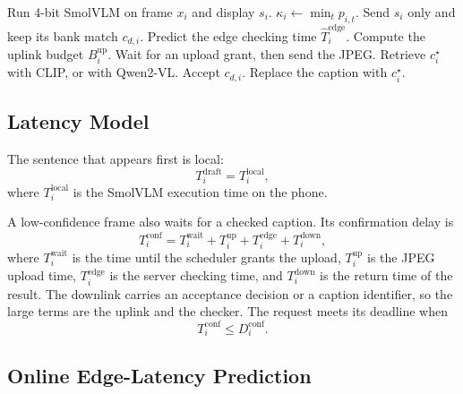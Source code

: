 \begin{algorithm}[t]
\caption{Local sentence and edge check}
\label{alg:verify}
\begin{algorithmic}[1]
\STATE Run 4-bit SmolVLM on frame $x_i$ and display $s_i$.
\STATE $\kappa_i\leftarrow\min_t p_{i,t}$.
    \STATE Send $s_i$ only and keep its bank match $c_{d,i}$.
\ELSE
    \STATE Predict the edge checking time $\hat T_i^{\mathrm{edge}}$.
    \STATE Compute the uplink budget $B_i^{\mathrm{up}}$.
    \STATE Wait for an upload grant, then send the JPEG.
    \STATE Retrieve $c_i^\star$ with CLIP, or with Qwen2-VL.
        \STATE Accept $c_{d,i}$.
    \ELSE
        \STATE Replace the caption with $c_i^\star$.
    \ENDIF
\ENDIF
\end{algorithmic}
\end{algorithm}

\subsection{Latency Model}

The sentence that appears first is local:
\begin{equation}
T_i^{\mathrm{draft}}
=
T_i^{\mathrm{local}},
\end{equation}
where $T_i^{\mathrm{local}}$ is the SmolVLM execution time on the phone.

A low-confidence frame also waits for a checked caption. Its confirmation
delay is
\begin{equation}
T_i^{\mathrm{conf}}
=
T_i^{\mathrm{wait}}
+
T_i^{\mathrm{up}}
+
T_i^{\mathrm{edge}}
+
T_i^{\mathrm{down}},
\end{equation}
where $T_i^{\mathrm{wait}}$ is the time until the scheduler grants the
upload, $T_i^{\mathrm{up}}$ is the JPEG upload time,
$T_i^{\mathrm{edge}}$ is the server checking time, and
$T_i^{\mathrm{down}}$ is the return time of the result. The downlink carries
an acceptance decision or a caption identifier, so the large terms are the
uplink and the checker. The request meets its deadline when
\begin{equation}
T_i^{\mathrm{conf}}
\leq
D_i^{\mathrm{conf}}.
\end{equation}

\subsection{Online Edge-Latency Prediction}

